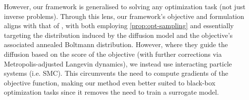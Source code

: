 However, our framework is generalised to solving any optimization task (not just inverse problems).
Through this lens, our framework's objective and formulation aligns with that of
\cite{kongDiffusionModelsConstrained2024}, with both employing \autoref{prop:opt-sampling} and
essentially targeting the distribution induced by the diffusion model and the objective's
associated annealed Boltmann distribution. However, where they guide the diffusion based on the
score of the objective (with further corrections via Metropolis-adjusted Langevin dynamics), we
instead use interacting particle systems (i.e. SMC). This circumvents the need to compute gradients
of the objective function, making our method even better suited to black-box optimization tasks
since it removes the need to train a surrogate model.
